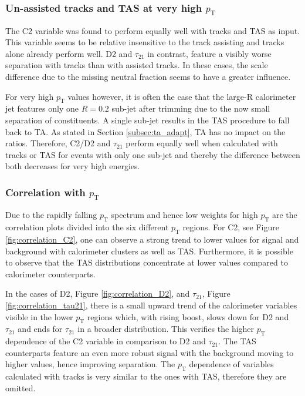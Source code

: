 \subsubsection{Un-assisted tracks and TAS at very high $p_{\mathrm{T}}$}
The C2 variable was found to perform equally well with tracks and TAS as input. This variable seems to be relative insensitive to the track assisting and tracks alone already perform well. D2 and $\tau_{21}$ in contrast, feature a visibly worse separation with tracks than with assisted tracks. In these cases, the scale difference due to the missing neutral fraction seems to have a greater influence.

For very high $p_{\mathrm{T}}$ values however, it is often the case that the large-R calorimeter jet features only one $R = 0.2$ sub-jet after trimming due to the now small separation of constituents. A single sub-jet results in the TAS procedure to fall back to TA. As stated in Section \ref{subsec:ta_adapt}, TA has no impact on the ratios. Therefore, C2/D2 and $\tau_{21}$ perform equally well when calculated with tracks or TAS for events with only one sub-jet and thereby the difference between both decreases for very high energies. 


\subsubsection{Correlation with $p_{\mathrm{T}}$}
Due to the rapidly falling $p_{\mathrm{T}}$ spectrum and hence low weights for high $p_{\mathrm{T}}$ are the correlation plots divided into the six different $p_{\mathrm{T}}$ regions.
For C2, see Figure \ref{fig:correlation_C2}, one can observe a strong trend to lower values for signal and background with calorimeter clusters as well as TAS. Furthermore, it is possible to observe that the TAS distributions concentrate at lower values compared to calorimeter counterparts.

In the cases of D2, Figure \ref{fig:correlation_D2}, and $\tau_{21}$, Figure \ref{fig:correlation_tau21}, there is a small upward trend of the calorimeter variables visible in the lower $p_{\mathrm{T}}$ regions which, with rising boost, slows down for D2 and $\tau_{21}$ and ends for $\tau_{21}$ in a broader distribution. This verifies the higher $p_{\mathrm{T}}$ dependence of the C2 variable in comparison to D2 and $\tau_{21}$. The TAS counterparts feature an even more robust signal with the background moving to higher values, hence improving separation. The $p_{\mathrm{T}}$ dependence of variables calculated with tracks is very similar to the ones with TAS, therefore they are omitted.

